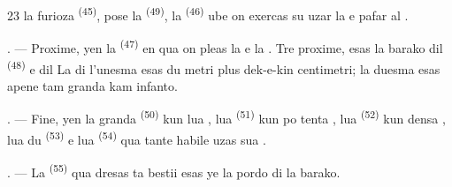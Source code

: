 \begin{VUpage}[25]{23}
\VUcontinue
la furioza  \textsuperscript{(45)}, pose la  \textsuperscript{(49)}, la\nl
{} \textsuperscript{(46)} ube on exercas su uzar la \nl
e pafar al .

. --- Proxime, yen la  \textsuperscript{(47)} en\nl
qua on pleas la  e la . Tre\nl
proxime, esas la barako dil  \textsuperscript{(48)} e dil\nl
{} La  di l'unesma esas du metri plus\nl
dek-e-kin centimetri; la duesma esas apene\nl
tam granda kam infanto.

. --- Fine, yen la granda  \textsuperscript{(50)}\nl
kun lua , lua  \textsuperscript{(51)} kun po\cc
tenta , lua  \textsuperscript{(52)} kun densa \cc
{}, lua du  \textsuperscript{(53)} e lua  \textsuperscript{(54)} qua\nl
tante habile uzas sua .

. --- La  \textsuperscript{(55)} qua dresas ta bestii\nl
esas ye la pordo di la barako.

\VUsaut{6.0mm}
\VUfilet{22mm}
\end{VUpage}
